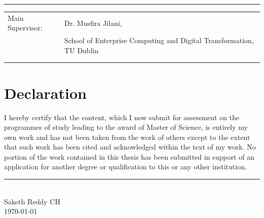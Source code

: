 \documentclass[11pt]{report}
\begin{document}
\begin{titlepage}
\begin{center}
 

	\hfill


	\vfill
\end{center}		
	\hrule
	\vspace{0.3cm}
	
	
	\begin{table}[h!]
		\begin{small} \sffamily
			\begin{tabular}{p{}p{}}
				Main Supervisor:    &Dr. Musfira Jilani,\\
				& School of Enterprise Computing and Digital Transformation, TU Dublin \\
				& \\
				& \\
						\end{tabular}
		\end{small}
	\end{table}
	
\end{titlepage}

\newpage

\chapter*{Declaration}


I hereby certify that the content, which I now submit for assessment on the programmes of study leading to the award of Master of Science, is entirely my own work and has not been taken from the work of others except to the extent that such work has been cited and acknowledged within the text of my work. No portion of the work contained in this thesis has been submitted in support of an application for another degree or qualification to this or any other institution. \\
\newline

\begin{flushright}
    

\noindent \rule{0.3\textwidth}{.3pt}\\
\vspace{0.5cm}
\noindent \large{Saketh Reddy CH}  \\      %
\today
\end{flushright}
\end{document}
